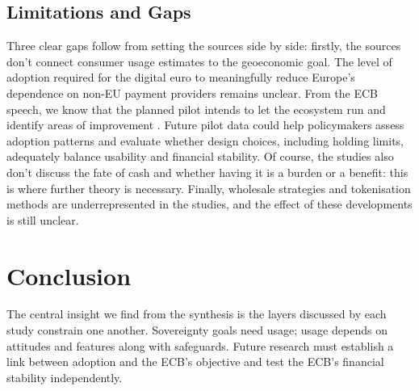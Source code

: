 \documentclass[10pt,a4paper,twocolumn]{article}
\begin{document}
\subsection{Limitations and Gaps}

Three clear gaps follow from setting the sources side by side: firstly, the sources don't connect consumer usage estimates to the geoeconomic goal. The level of adoption required for the digital euro to meaningfully reduce Europe's dependence on non-EU payment providers remains unclear. From the ECB speech, we know that the planned pilot intends to let the ecosystem run and identify areas of improvement \parencite{Cipollone2026a}. Future pilot data could help policymakers assess adoption patterns and evaluate whether design choices, including holding limits, adequately balance usability and financial stability. Of course, the studies also don't discuss the fate of cash and whether having it is a burden or a benefit: this is where further theory is necessary. Finally, wholesale strategies and tokenisation methods are underrepresented in the studies, and the effect of these developments is still unclear.

\section{Conclusion}

The central insight we find from the synthesis is the layers discussed by each study constrain one another. Sovereignty goals need usage; usage depends on attitudes and features along with safeguards. Future research must establish a link between adoption and the ECB's objective and test the ECB's financial stability independently.

\printbibliography[title={References}]

\vspace{1em}
\end{document}
